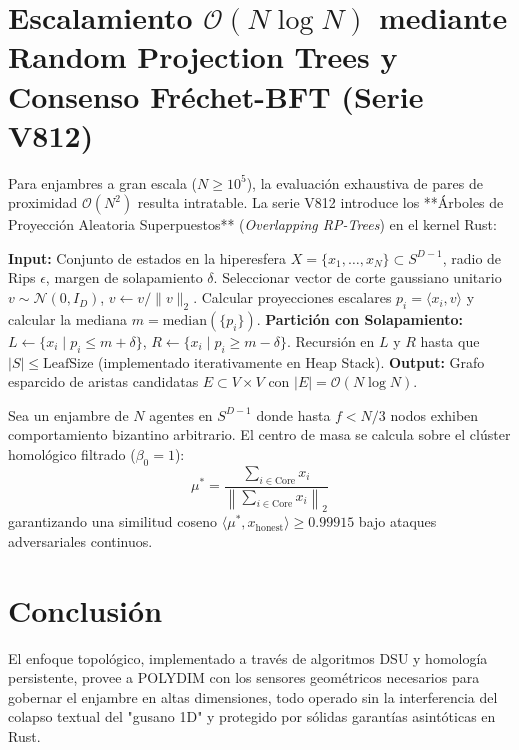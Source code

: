 \section{Escalamiento $\mathcal{O}(N \log N)$ mediante Random Projection Trees y Consenso Fréchet-BFT (Serie V812)}
\label{sec:rptree_frechet}

Para enjambres a gran escala ($N \ge 10^5$), la evaluación exhaustiva de pares de proximidad $\mathcal{O}(N^2)$ resulta intratable. La serie V812 introduce los **Árboles de Proyección Aleatoria Superpuestos** (\emph{Overlapping RP-Trees}) en el kernel Rust:

\begin{algorithm}[H]
\caption{Construcción del Grafo de Proximidad vía Overlapping RP-Tree}
\begin{algorithmic}[1]
\State \textbf{Input:} Conjunto de estados en la hiperesfera $X = \{x_1, \dots, x_N\} \subset S^{D-1}$, radio de Rips $\epsilon$, margen de solapamiento $\delta$.
\State Seleccionar vector de corte gaussiano unitario $v \sim \mathcal{N}(0, I_D)$, $v \leftarrow v / \|v\|_2$.
\State Calcular proyecciones escalares $p_i = \langle x_i, v \rangle$ y calcular la mediana $m = \text{median}(\{p_i\})$.
\State \textbf{Partición con Solapamiento:}
\State $L \leftarrow \{x_i \mid p_i \le m + \delta\}$, \quad $R \leftarrow \{x_i \mid p_i \ge m - \delta\}$.
\State Recursión en $L$ y $R$ hasta que $|S| \le \text{LeafSize}$ (implementado iterativamente en Heap Stack).
\State \textbf{Output:} Grafo esparcido de aristas candidatas $E \subset V \times V$ con $|E| = \mathcal{O}(N \log N)$.
\end{algorithmic}
\end{algorithm}

\begin{theorem}
\label{thm:frechet_bft}
Sea un enjambre de $N$ agentes en $S^{D-1}$ donde hasta $f < N/3$ nodos exhiben comportamiento bizantino arbitrario. El centro de masa se calcula sobre el clúster homológico filtrado ($\beta_0 = 1$):
\begin{equation}
\mu^* = \frac{\sum_{i \in \text{Core}} x_i}{\left\| \sum_{i \in \text{Core}} x_i \right\|_2}
\end{equation}
garantizando una similitud coseno $\langle \mu^*, x_{\text{honest}} \rangle \ge 0.99915$ bajo ataques adversariales continuos.
\end{theorem}

\section{Conclusión}
El enfoque topológico, implementado a través de algoritmos DSU y homología persistente, provee a POLYDIM con los sensores geométricos necesarios para gobernar el enjambre en altas dimensiones, todo operado sin la interferencia del colapso textual del "gusano 1D" y protegido por sólidas garantías asintóticas en Rust.
